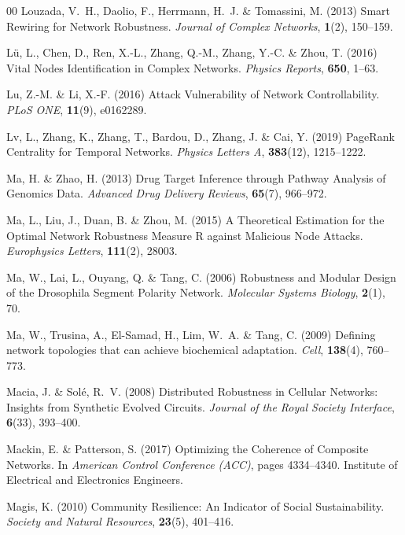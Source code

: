 \documentclass{comnet-mod}
\begin{document}
\begin{thebibliography}{00}
Louzada, V.~H., Daolio, F., Herrmann, H.~J. {\&} Tomassini, M. (2013)  {Smart
  Rewiring for Network Robustness}. {\em {Journal of Complex Networks}},
  \textbf{1}(2), 150--159.

L{\"u}, L., Chen, D., Ren, X.-L., Zhang, Q.-M., Zhang, Y.-C. {\&} Zhou, T.
  (2016)  {Vital Nodes Identification in Complex Networks}. {\em {Physics
  Reports}}, \textbf{650}, 1--63.

Lu, Z.-M. {\&} Li, X.-F. (2016)  {Attack Vulnerability of Network
  Controllability}. {\em {PLoS ONE}}, \textbf{11}(9), e0162289.

Lv, L., Zhang, K., Zhang, T., Bardou, D., Zhang, J. {\&} Cai, Y. (2019)
  {{{PageRank}} Centrality for Temporal Networks}. {\em {Physics Letters A}},
  \textbf{383}(12), 1215--1222.

Ma, H. {\&} Zhao, H. (2013)  {Drug Target Inference through Pathway Analysis of
  Genomics Data}. {\em {Advanced Drug Delivery Reviews}}, \textbf{65}(7),
  966--972.

Ma, L., Liu, J., Duan, B. {\&} Zhou, M. (2015)  {A Theoretical Estimation for
  the Optimal Network Robustness Measure {{R}} against Malicious Node Attacks}.
  {\em {Europhysics Letters}}, \textbf{111}(2), 28003.

Ma, W., Lai, L., Ouyang, Q. {\&} Tang, C. (2006)  {Robustness and Modular
  Design of the {{Drosophila}} Segment Polarity Network}. {\em {Molecular
  Systems Biology}}, \textbf{2}(1), 70.

Ma, W., Trusina, A., El-Samad, H., Lim, W.~A. {\&} Tang, C. (2009)  Defining
  network topologies that can achieve biochemical adaptation. {\em Cell},
  \textbf{138}(4), 760--773.

Macia, J. {\&} Sol{\'e}, R.~V. (2008)  {Distributed Robustness in Cellular
  Networks: {{Insights}} from Synthetic Evolved Circuits}. {\em {Journal of the
  Royal Society Interface}}, \textbf{6}(33), 393--400.

Mackin, E. {\&} Patterson, S. (2017)  {Optimizing the Coherence of Composite
  Networks}. In {\em {American Control Conference ({{ACC}})}}, pages
  4334--4340. {Institute of Electrical and Electronics Engineers}.

Magis, K. (2010)  {Community Resilience: {{An}} Indicator of Social
  Sustainability}. {\em {Society and Natural Resources}}, \textbf{23}(5),
  401--416.


\end{thebibliography}
\end{document}
